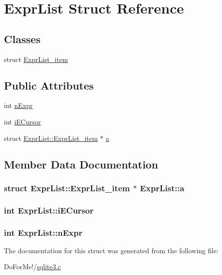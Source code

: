 \hypertarget{struct_expr_list}{\section{Expr\-List Struct Reference}
\label{struct_expr_list}
}
\subsection*{Classes}
\begin{DoxyCompactItemize}
\item 
struct \hyperlink{struct_expr_list_1_1_expr_list__item}{Expr\-List\-\_\-item}
\end{DoxyCompactItemize}
\subsection*{Public Attributes}
\begin{DoxyCompactItemize}
\item 
int \hyperlink{struct_expr_list_a88bdbd62cce306124eea63ae9f80ec33}{n\-Expr}
\item 
int \hyperlink{struct_expr_list_aab870b9af60d25992f8672331d951ca0}{i\-E\-Cursor}
\item 
struct \hyperlink{struct_expr_list_1_1_expr_list__item}{Expr\-List\-::\-Expr\-List\-\_\-item} $\ast$ \hyperlink{struct_expr_list_a02a4222d2dc4da64dcec416188abc16c}{a}
\end{DoxyCompactItemize}


\subsection{Member Data Documentation}
\hypertarget{struct_expr_list_a02a4222d2dc4da64dcec416188abc16c}{
\subsubsection[{a}]{\setlength{\rightskip}{0pt plus 5cm}struct {\bf Expr\-List\-::\-Expr\-List\-\_\-item} $\ast$ Expr\-List\-::a}}\label{struct_expr_list_a02a4222d2dc4da64dcec416188abc16c}
\hypertarget{struct_expr_list_aab870b9af60d25992f8672331d951ca0}{
\subsubsection[{i\-E\-Cursor}]{\setlength{\rightskip}{0pt plus 5cm}int Expr\-List\-::i\-E\-Cursor}}\label{struct_expr_list_aab870b9af60d25992f8672331d951ca0}
\hypertarget{struct_expr_list_a88bdbd62cce306124eea63ae9f80ec33}{
\subsubsection[{n\-Expr}]{\setlength{\rightskip}{0pt plus 5cm}int Expr\-List\-::n\-Expr}}\label{struct_expr_list_a88bdbd62cce306124eea63ae9f80ec33}


The documentation for this struct was generated from the following file\-:\begin{DoxyCompactItemize}
\item 
Do\-For\-Me!/\hyperlink{sqlite3_8c}{sqlite3.\-c}\end{DoxyCompactItemize}
